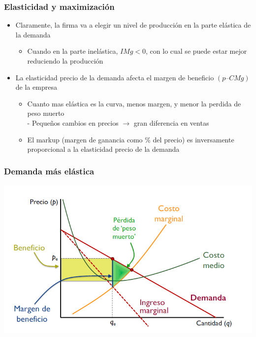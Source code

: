 \documentclass{beamer}
\begin{document}
\begin{frame}
\frametitle{Elasticidad y maximización}
\begin{itemize}
    \item Claramente, la firma va a elegir un nivel de producción en la parte elástica de la demanda\vspace{2mm}
    \begin{itemize}
        \item Cuando en la parte inelástica, $IMg < 0$, con lo cual se puede estar mejor reduciendo la producción\vspace{4mm}
    \end{itemize}
    \item La elasticidad precio de la demanda afecta el margen de beneficio $(p – CMg)$ de la empresa\vspace{2mm}
    \begin{itemize}
        \item Cuanto mas elástica es la curva, menos margen, y menor la perdida de peso muerto \\
        - Pequeños cambios en precios $\rightarrow$ gran diferencia en ventas
        \item El markup (margen de ganancia como \% del precio) es inversamente proporcional a la elasticidad precio de la demanda
    \end{itemize}
\end{itemize}
\end{frame}

\begin{frame}
\frametitle{Demanda más elástica}
\includegraphics[scale=0.6]{Slides Principios de Economia/Figures/Tema_06.47_elasticidad3.png}
\end{frame}
\end{document}
